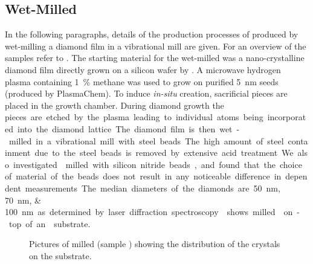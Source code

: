 	\subsection{Wet-Milled \CVD \Nds}\label{subsec::milled_nds}

		In the following paragraphs, details of the production processes of \nd produced by wet-milling a \CVD diamond film in a vibrational mill are given.
		For an overview of the samples refer to .
		The starting material for the wet-milled \nds was a nano-crystalline diamond film \cite{Williams2006a} directly grown on a silicon wafer by \CVD.
		A microwave hydrogen plasma containing \SI{1}{\percent} methane was used to grow on purified \SI{5}{\nano\meter} \nd seeds (produced by PlasmaChem).
		To induce \textit{in-situ} \siv creation, sacrificial \Si pieces are placed in the growth chamber.
		During diamond growth the \si pieces are etched by the plasma leading to individual atoms being incorporated into the diamond lattice.
		The diamond film is then wet-milled in a vibrational mill with steel beads.
		The high amount of steel containment due to the steel beads is removed by extensive acid treatment.
		We also investigated \nds milled with silicon nitride beads, and found that the choice of material of the beads does not result in any noticeable difference in dependent measurements.
		The median diameters of the diamonds are \SIlist{50; 70; 100}{\nano\meter} as determined by laser diffraction spectroscopy.  shows milled \nds on-top of an \ir substrate.

		\begin{figure}[htp]
			\centering
			\caption[Distribution of \nds on-top of an \ir substrate]{Pictures of milled \nds (sample \insituH) showing the distribution of the \nd crystals on the \ir substrate.}
			 \label{fig::sem_milled}
		\end{figure}

